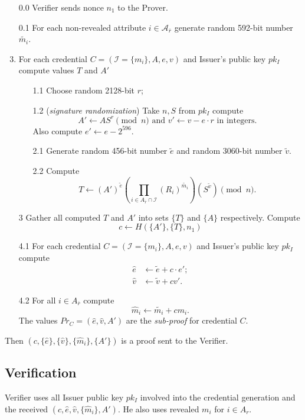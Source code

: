\documentclass[a4paper]{article}
\begin{document}
  
\begin{enumerate}
\item [0.0] Verifier sends nonce $n_1$ to the Prover.
\item [0.1] For each non-revealed attribute $i\in \mathcal{A}_{\overline{r}}$ generate random 592-bit number $\widetilde{m_i}$.
\item For each credential $C = (\mathcal{I}=\{m_i\},A,e,v)$ and Issuer's 
public key $pk_I$ compute values $T$ and $A'$\begin{enumerate}
\item [1.1] Choose random 2128-bit $r$;
\item [1.2] (\emph{signature randomization}) Take $n,S$ from $pk_I$ compute 
\begin{equation}\label{eq:aprime}
A' \leftarrow A S^{r}\pmod{n}
\text{ and } v' \leftarrow v - e\cdot r\text{ in integers.}
\end{equation} 
Also compute $e' \leftarrow e - 2^{596}$.
\item[2.1] Generate random 456-bit number $\widetilde{e}$ and random 3060-bit number $\widetilde{v}$.
\item[2.2] Compute 
$$
T \leftarrow (A')^{\widetilde{e}}\left(\prod_{i\in A_{\overline{r}}\cap \mathcal{I}} (R_i)^{\widetilde{m_i}}\right)(S^{\widetilde{v}})\pmod{n}.
$$
\end{enumerate}
\item[3] Gather all computed $T$ and $A'$ into sets $\{T\}$ and $\{A\}$ respectively. Compute 
$$
c\leftarrow H(\{A'\},\{T\},n_1)
$$
\item[4.1] For each credential $C = (\mathcal{I}=\{m_i\},A,e,v)$ and Issuer's 
public key $pk_I$ compute
\begin{align*}
\widehat{e}& \leftarrow \widetilde{e}+c\cdot e';\\
\widehat{v} &\leftarrow \widetilde{v}+cv'.
\end{align*}
\item[4.2] For all $i\in A_{\overline{r}}$ compute
$$ 
\widehat{m}_i \leftarrow \widetilde{m_i} + cm_i.
$$
The values $Pr_C=(\widehat{e},\widehat{v},A')$ are the \emph{sub-proof}
for credential $C$.

\end{enumerate}
Then $(c,\{\widehat{e}\},\{\widehat{v}\},\{\widehat{m}_i\},\{A'\})$ is a proof sent to the Verifier.

\subsection{Verification}
Verifier uses all Issuer public key $pk_I$ involved into the credential generation and  the received $(c,\widehat{e},\widehat{v},\{\widehat{m}_i\},A')$. He also uses revealed 
$m_i$ for $i\in A_r$.
\end{document}
